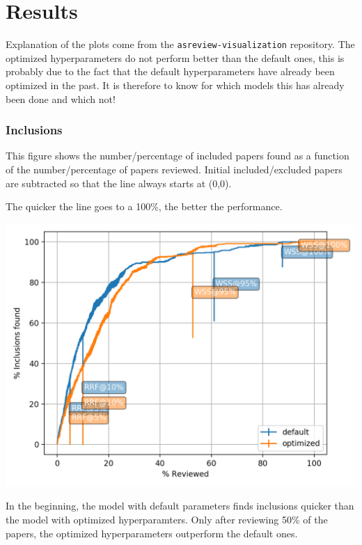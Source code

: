\documentclass[
]{book}
\begin{document}
\hypertarget{results}{%
\section{Results}\label{results}}

Explanation of the plots come from the \texttt{asreview-visualization} repository.
The optimized hyperparameters do not perform better than the default ones, this is probably due to the fact that the default hyperparameters have already been optimized in the past. It is therefore to know for which models this has already been done and which not!

\pagebreak

\hypertarget{inclusions}{%
\subsubsection{Inclusions}\label{inclusions}}

This figure shows the number/percentage of included papers found as a function of the
number/percentage of papers reviewed. Initial included/excluded papers are subtracted so that the line
always starts at (0,0).

The quicker the line goes to a 100\%, the better the performance.

\includegraphics{figs/myfirstsim/Figure_1.png}

In the beginning, the model with default parameters finds inclusions quicker than the model with optimized hyperparamters.
Only after reviewing 50\% of the papers, the optimized hyperparameters outperform the default ones.
\end{document}
